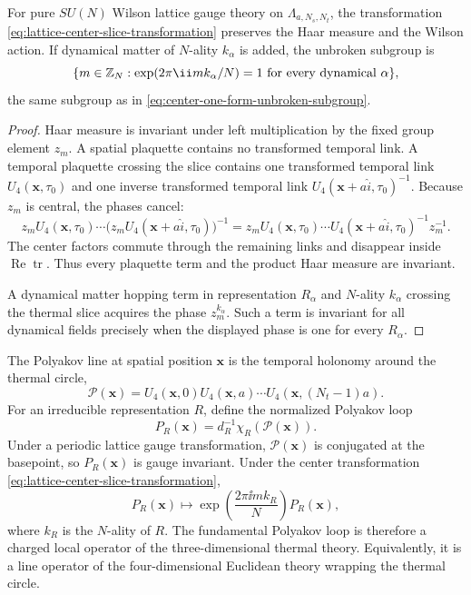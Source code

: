 \begin{lemma}
\label{lem:lattice-center-symmetry}
For pure \(SU(N)\) Wilson lattice gauge theory on
\(\Lambda_{a,N_s,N_t}\), the transformation
\eqref{eq:lattice-center-slice-transformation} preserves the Haar measure and
the Wilson action.  If dynamical matter of \(N\)-ality \(k_\alpha\) is added,
the unbroken subgroup is
\[
  \{m\in\mathbb Z_N:\exp(2\pi\ii m k_\alpha/N)=1
  \hbox{ for every dynamical } \alpha\},
\]
the same subgroup as in \eqref{eq:center-one-form-unbroken-subgroup}.
\end{lemma}

\begin{proof}
  Haar measure is invariant under left multiplication by the fixed group
  element \(z_m\).  A spatial plaquette contains no transformed temporal link.
  A temporal plaquette crossing the slice contains one transformed temporal
  link \(U_4(\mathbf x,\tau_0)\) and one inverse transformed temporal link
  \(U_4(\mathbf x+a\widehat i,\tau_0)^{-1}\).  Because \(z_m\) is central,
  the phases cancel:
  \[
    z_m U_4(\mathbf x,\tau_0)\cdots
    \bigl(z_m U_4(\mathbf x+a\widehat i,\tau_0)\bigr)^{-1}
    =
    z_m U_4(\mathbf x,\tau_0)\cdots
    U_4(\mathbf x+a\widehat i,\tau_0)^{-1}z_m^{-1}.
  \]
  The center factors commute through the remaining links and disappear inside
  \(\operatorname{Re}\operatorname{tr}\).  Thus every plaquette term and the
  product Haar measure are invariant.

  A dynamical matter hopping term in representation \(R_\alpha\) and
  \(N\)-ality \(k_\alpha\) crossing the thermal slice acquires the phase
  \(z_m^{k_\alpha}\).  Such a term is invariant for all dynamical fields
  precisely when the displayed phase is one for every \(R_\alpha\).
\end{proof}

The Polyakov line at spatial position \(\mathbf x\) is the temporal holonomy
around the thermal circle,
\begin{equation}
  \mathcal P(\mathbf x)
  =
  U_4(\mathbf x,0)
  U_4(\mathbf x,a)\cdots
  U_4(\mathbf x,(N_t-1)a).
  \label{eq:lattice-polyakov-holonomy}
\end{equation}
For an irreducible representation \(R\), define the normalized Polyakov loop
\begin{equation}
  P_R(\mathbf x)
  =
  d_R^{-1}\chi_R(\mathcal P(\mathbf x)).
  \label{eq:lattice-polyakov-loop-definition}
\end{equation}
Under a periodic lattice gauge transformation,
\(\mathcal P(\mathbf x)\) is conjugated at the basepoint, so \(P_R(\mathbf x)\)
is gauge invariant.  Under the center transformation
\eqref{eq:lattice-center-slice-transformation},
\begin{equation}
  P_R(\mathbf x)
  \longmapsto
  \exp\left(\frac{2\pi\ii m k_R}{N}\right)P_R(\mathbf x),
  \label{eq:lattice-polyakov-center-charge}
\end{equation}
where \(k_R\) is the \(N\)-ality of \(R\).  The fundamental Polyakov loop is
therefore a charged local operator of the three-dimensional thermal theory.
Equivalently, it is a line operator of the four-dimensional Euclidean theory
wrapping the thermal circle.

